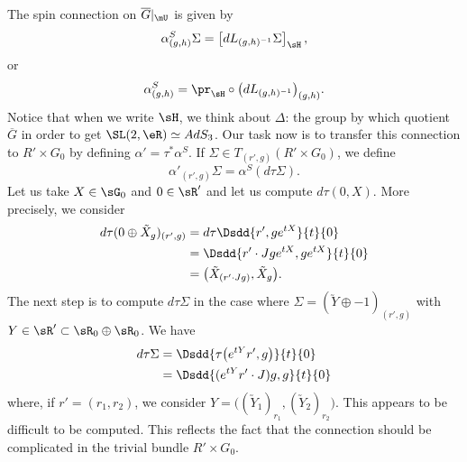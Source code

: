 The spin connection on $\overline{G}|_{\mU}$ is given by
\begin{equation}    \label{EqDefConnAdS3}
	\alpha^{S}_{(g,h)}\Sigma=\left[ dL_{(g,h)^{-1}}\Sigma \right]_{\sH},
\end{equation}
or
\begin{equation}
	\alpha^{S}_{(g,h)}=\pr_{\sH}\circ\big( dL_{(g,h)^{-1}} \big)_{(g,h)}.
\end{equation}
Notice that when we write $\sH$, we think about $\Delta$: the group by which quotient  $\overline{G}$ in order to get $\SL(2,\eR)\simeq AdS_3$.
Our task now is to transfer this connection to $R'\times G_0$ by defining $\alpha'=\tau^*\alpha^{S}$. If $\Sigma\in T_{(r',g)}(R'\times G_0)$, we define
\begin{equation}
	\alpha'_{(r',g)}\Sigma=\alpha^{S}(d\tau\Sigma).
\end{equation}
Let us take $X\in\sG_0$ and $0\in\sR'$ and let us compute $d\tau(0,X)$. More precisely, we consider
\begin{align*}
	d\tau(0\oplus \tilde X_{g})_{(r',g)} & =d\tau\Dsdd{ r',g e^{tX} }{t}{0}                   \\
	                                     & =\Dsdd{ r'\cdot Jg e^{tX},g e^{tX} }{t}{0}         \\
	                                     & =\big( \tilde X_{(r'\cdot Jg)},\tilde X_{g} \big).
\end{align*}
The next step is to compute $d\tau\Sigma$ in the case where $\Sigma=(\utilde Y\oplus -1)_{(r',g)}$ with $Y\in\sR'\subset\sR_{0}\oplus\sR_{0}$. We have
\begin{align}
	d\tau\Sigma & =\Dsdd{ \tau\big(  e^{tY}r',g \big) }{t}{0} \\
	            & =\Dsdd{ ( e^{tY}r'\cdot J)g,g }{t}{0}
\end{align}
where, if $r'=(r_{1},r_{2})$, we consider $Y=\big((\utilde Y_{1})_{r_{1}},(\utilde Y_{2})_{r_{2}}\big)  $. This appears to be difficult to be computed. This reflects the fact that the connection should be complicated in the trivial bundle $R'\times G_0$.

